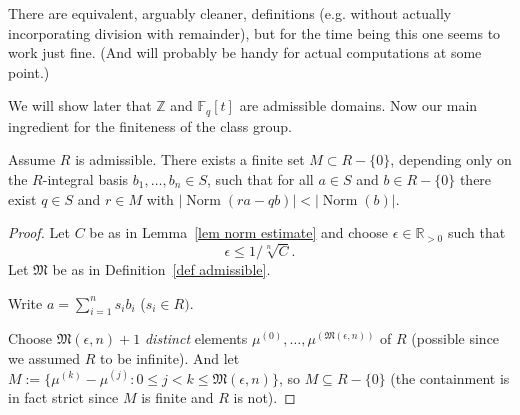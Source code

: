 \documentclass{amsart}
\newcommand{\Z}{\mathbb{Z}}
\newcommand{\R}{\mathbb{R}}
\newcommand{\Fq}{\mathbb{F}_q}
\newcommand{\M}{\mathfrak{M}}
\newcommand{\NN}{\operatorname{Norm}}
\begin{document}
There are equivalent, arguably cleaner, definitions (e.g. without actually incorporating division with remainder), but for the time being this one seems to work just fine. (And will probably be handy for actual computations at some point.)

We will show later that $\Z$ and $\Fq[t]$ are admissible domains.
Now our main ingredient for the finiteness of the class group.

\begin{theorem} Assume $R$ is admissible.
There exists a finite set $M \subset R-\{0\}$, depending only on the $R$-integral basis $b_1,\ldots,b_n \in S$, such that
for all $a \in S$ and $b \in R-\{0\}$ there exist $q \in S$ and $r \in M$ with $|\NN(ra-qb)| < |\NN(b)|$.
\end{theorem}

\begin{proof}

Let $C$ be as in Lemma~\ref{lem norm estimate} and choose $\epsilon \in \R_{>0}$ such that
\begin{equation}\label{eqn choice epsilon}
\epsilon \leq 1/\sqrt[n]{C}.
\end{equation}
Let $\M$ be as in Definition~\ref{def admissible}.

Write $a=\sum_{i=1}^n s_i b_i$ ($s_i\in R)$.

Choose $\M(\epsilon,n)+1$ \emph{distinct} elements $\mu^{(0)},\ldots,\mu^{(\M(\epsilon,n))}$ of $R$ (possible since we assumed $R$ to be infinite).
And let $M:=\{\mu^{(k)}-\mu^{(j)} : 0\leq j<k\leq \M(\epsilon,n)\}$, so $M \subseteq R-\{0\}$ (the containment is in fact strict since $M$ is finite and $R$ is not).


\end{proof}
\end{document}
